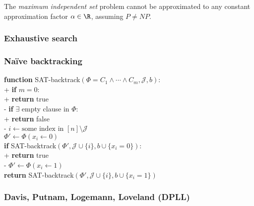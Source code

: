 \documentclass{article}
\begin{document}
\begin{theorem}
	The \emph{maximum independent set} problem cannot be approximated to
	any constant approximation factor $\alpha\in\R$, assuming $P\not= NP$.
\end{theorem}

\subsubsection{Exhaustive search}

\subsubsection{Na\"ive backtracking}

\begin{pseudo}
	\textbf{function} \textsf{SAT-backtrack}$(\Phi=C_1\wedge\cdots\wedge C_m, \mathcal{J}, b)$:\\+
	\textbf{if} $m=0$:\\+ \textbf{return} \textsf{true}\\-
	\textbf{if} $\exists$ empty clause in $\Phi$:\\+
	\textbf{return} \textsf{false}\\-
	$i\leftarrow\text{some index in $[n]\setminus\mathcal{J}$}$\\
	$\Phi'\leftarrow\Phi(x_i\leftarrow 0)$\\
	\textbf{if} \textsf{SAT-backtrack}$(\Phi', \mathcal{J}\cup\{i\}, b\cup\{x_i=0\})$:\\+
	\textbf{return} \textsf{true}\\-
	$\Phi'\leftarrow\Phi(x_i\leftarrow 1)$\\
	\textbf{return} \textsf{SAT-backtrack}$(\Phi',\mathcal{J}\cup\{i\}, b\cup\{x_i=1\})$
\end{pseudo}

\subsubsection{Davis, Putnam, Logemann, Loveland (DPLL)}
\end{document}
